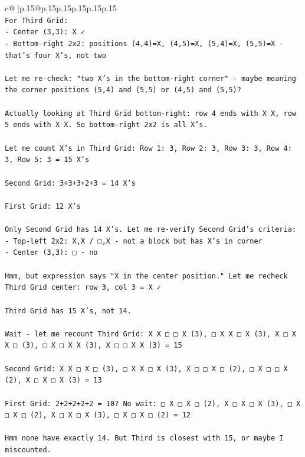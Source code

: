 \documentclass{article}
\begin{document}
{\begin{supertabular}{c@{$\;$}|p{.15\linewidth}@{}p{.15\linewidth}p{.15\linewidth}p{.15\linewidth}p{.15\linewidth}p{.15\linewidth}}
{{{\\ 
\texttt{For Third Grid:} \\
\texttt{{-} Center (3,3): X ✓} \\
\texttt{{-} Bottom{-}right 2x2: positions (4,4)=X, (4,5)=X, (5,4)=X, (5,5)=X {-} that's four X's, not two} \\
\\ 
\texttt{Let me re{-}check: "two X's in the bottom{-}right corner" {-} maybe meaning the corner positions (5,4) and (5,5) or (4,5) and (5,5)?} \\
\\ 
\texttt{Actually looking at Third Grid bottom{-}right: row 4 ends with X X, row 5 ends with X X. So bottom{-}right 2x2 is all X's.} \\
\\ 
\texttt{Let me count X's in Third Grid: Row 1: 3, Row 2: 3, Row 3: 3, Row 4: 3, Row 5: 3 = 15 X's} \\
\\ 
\texttt{Second Grid: 3+3+3+2+3 = 14 X's} \\
\\ 
\texttt{First Grid: 12 X's} \\
\\ 
\texttt{Only Second Grid has 14 X's. Let me re{-}verify Second Grid's criteria:} \\
\texttt{{-} Top{-}left 2x2: X,X / □,X {-} not a block but has X's in corner} \\
\texttt{{-} Center (3,3): □ {-} no} \\
\\ 
\texttt{Hmm, but expression says "X in the center position." Let me recheck Third Grid center: row 3, col 3 = X ✓} \\
\\ 
\texttt{Third Grid has 15 X's, not 14.} \\
\\ 
\texttt{Wait {-} let me recount Third Grid: X X □ □ X (3), □ X X □ X (3), X □ X X □ (3), □ X □ X X (3), X □ □ X X (3) = 15} \\
\\ 
\texttt{Second Grid: X X □ X □ (3), □ X X □ X (3), X □ □ X □ (2), □ X □ □ X (2), X □ X □ X (3) = 13} \\
\\ 
\texttt{First Grid: 2+2+2+2+2 = 10? No wait: □ X □ X □ (2), X □ X □ X (3), □ X □ X □ (2), X □ X □ X (3), □ X □ X □ (2) = 12} \\
\\ 
\texttt{Hmm none have exactly 14. But Third is closest with 15, or maybe I miscounted.} \\
}}}
\end{supertabular}}
\end{document}
